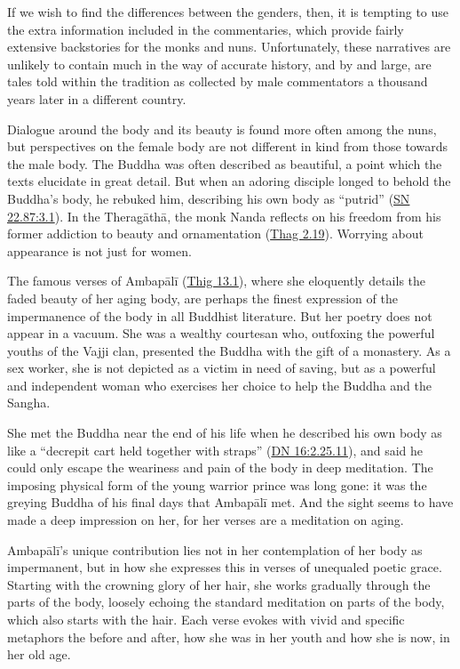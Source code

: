 \documentclass[12pt,openany]{book}%
\begin{document}
If we wish to find the differences between the genders, then, it is tempting to use the extra information included in the commentaries, which provide fairly extensive backstories for the monks and nuns. Unfortunately, these narratives are unlikely to contain much in the way of accurate history, and by and large, are tales told within the tradition as collected by male commentators a thousand years later in a different country.

Dialogue around the body and its beauty is found more often among the nuns, but perspectives on the female body are not different in kind from those towards the male body. The Buddha was often described as beautiful, a point which the texts elucidate in great detail. But when an adoring disciple longed to behold the Buddha’s body, he rebuked him, describing his own body as “putrid” (\href{https://suttacentral.net/sn22.87/en/sujato\#3.1}{SN 22.87:3.1}). In the \textsanskrit{Theragāthā}, the monk Nanda reflects on his freedom from his former addiction to beauty and ornamentation (\href{https://suttacentral.net/thag2.19}{Thag 2.19}). Worrying about appearance is not just for women.

The famous verses of \textsanskrit{Ambapālī} (\href{https://suttacentral.net/thig13.1/en/sujato}{Thig 13.1}), where she eloquently details the faded beauty of her aging body, are perhaps the finest expression of the impermanence of the body in all Buddhist literature. But her poetry does not appear in a vacuum. She was a wealthy courtesan who, outfoxing the powerful youths of the Vajji clan, presented the Buddha with the gift of a monastery. As a sex worker, she is not depicted as a victim in need of saving, but as a powerful and independent woman who exercises her choice to help the Buddha and the Sangha. 

She met the Buddha near the end of his life when he described his own body as like a “decrepit cart held together with straps” (\href{https://suttacentral.net/dn16/en/sujato\#2.25.11}{DN 16:2.25.11}), and said he could only escape the weariness and pain of the body in deep meditation. The imposing physical form of the young warrior prince was long gone: it was the greying Buddha of his final days that \textsanskrit{Ambapālī} met. And the sight seems to have made a deep impression on her, for her verses are a meditation on aging.

\textsanskrit{Ambapālī}’s unique contribution lies not in her contemplation of her body as impermanent, but in how she expresses this in verses of unequaled poetic grace. Starting with the crowning glory of her hair, she works gradually through the parts of the body, loosely echoing the standard meditation on parts of the body, which also starts with the hair. Each verse evokes with vivid and specific metaphors the before and after, how she was in her youth and how she is now, in her old age. 
\end{document}
